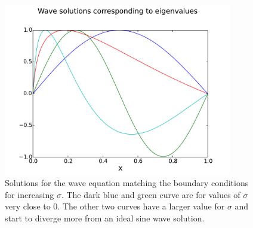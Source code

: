 \begin{figure}
\centering
\includegraphics[width=10cm]{../src/plot/IncreasingSig}
\caption{Solutions for the wave equation matching the boundary conditions for increasing $ \sigma $. The dark blue and green curve are for values of $ \sigma $ very close to 0. The other two curves have a larger value for $ \sigma $ and start to diverge more from an ideal sine wave solution.}
\label{fig:IncreasingSig}
\end{figure}
